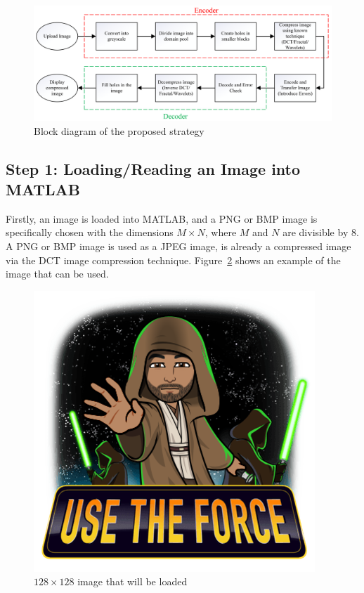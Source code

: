 \documentclass[10pt,twocolumn, a4paper]{witseiepaper}
\begin{document}
\begin{figure}[h!]
\renewcommand{\thefigure}{\arabic{figure}}
\hspace{-0.5cm}
\includegraphics[scale=0.16]{BlockDiagram.png}
\caption{Block diagram of the proposed strategy}
\label{fig: Block Diagram}
\end{figure}

\subsection{Step 1: Loading/Reading an Image into MATLAB}
\label{sec: Step 1}
Firstly, an image is loaded into MATLAB, and a PNG or BMP image is specifically chosen with the dimensions $M\times N$, where $M$ and $N$ are divisible by 8. A PNG or BMP image is used as a JPEG image, is already a compressed image via the DCT image compression technique. Figure~\ref{fig: Step 1} shows an example of the image that can be used. 
\begin{figure}[h!]
\renewcommand{\thefigure}{\arabic{figure}}
\centering
\includegraphics[scale=0.5, frame]{Step1.png}
\caption{$128\times 128$ image that will be loaded}
\label{fig: Step 1}
\end{figure}
\end{document}
